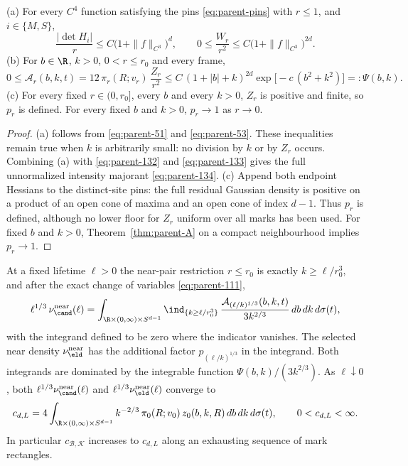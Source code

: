 \begin{lemma}\label{lem:parent-majorant}
\textup{(a)} For every $C^4$ function satisfying the pins \eqref{eq:parent-pins} with $r\le1$, and $i\in\{M,S\}$,
\begin{equation}\label{eq:parent-detbound}
\frac{|\det H_i|}r\le C\bigl(1+\|f\|_{C^3}\bigr)^d,\qquad 0\le\frac{W_r}{r^2}\le C\bigl(1+\|f\|_{C^3}\bigr)^{2d}.
\end{equation}
\textup{(b)} For $b\in\R$, $k>0$, $0<r\le r_0$ and every frame,
\begin{equation}\label{eq:parent-134}
0\le\mathcal A_r(b,k,t)=12\,\pi_r(R;v_r)\,\frac{Z_r}{r^2}\le C\,(1+|b|+k)^{2d}\exp\bigl[-c\,(b^2+k^2)\bigr]=:\Psi(b,k).
\end{equation}
\textup{(c)} For every fixed $r\in(0,r_0]$, every $b$ and every $k>0$, $Z_r$ is positive and finite, so $p_r$ is defined. For every fixed $b$ and $k>0$, $p_r\to1$ as $r\to0$.
\end{lemma}

\begin{proof}
(a) follows from \eqref{eq:parent-51} and \eqref{eq:parent-53}. These inequalities remain true when $k$ is arbitrarily small: no division by $k$ or by $Z_r$ occurs. Combining (a) with \eqref{eq:parent-132} and \eqref{eq:parent-133} gives the full unnormalized intensity majorant \eqref{eq:parent-134}. (c) Append both endpoint Hessians to the distinct-site pins: the full residual Gaussian density is positive on a product of an open cone of maxima and an open cone of index $d-1$. Thus $p_r$ is defined, although no lower floor for $Z_r$ uniform over all marks has been used. For fixed $b$ and $k>0$, Theorem~\ref{thm:parent-A} on a compact neighbourhood implies $p_r\to1$.
\end{proof}

\begin{proposition}\label{prop:parent-near}
At a fixed lifetime $\ell>0$ the near-pair restriction $r\le r_0$ is exactly $k\ge\ell/r_0^3$, and after the exact change of variables \eqref{eq:parent-111},
\begin{equation}\label{eq:parent-135}
\ell^{1/3}\,\nu^{\rm near}_\cand(\ell)=\int_{\R\times(0,\infty)\times S^{d-1}}\ind_{\{k\ge\ell/r_0^3\}}\,\frac{\mathcal A_{(\ell/k)^{1/3}}(b,k,t)}{3k^{2/3}}\,db\,dk\,d\sigma(t),
\end{equation}
with the integrand defined to be zero where the indicator vanishes. The selected near density $\nu^{\rm near}_\eld$ has the additional factor $p_{(\ell/k)^{1/3}}$ in the integrand. Both integrands are dominated by the integrable function $\Psi(b,k)/(3k^{2/3})$. As $\ell\downarrow0$, both $\ell^{1/3}\nu^{\rm near}_\cand(\ell)$ and $\ell^{1/3}\nu^{\rm near}_\eld(\ell)$ converge to
\begin{equation}\label{eq:parent-136}
c_{d,L}=4\int_{\R\times(0,\infty)\times S^{d-1}}k^{-2/3}\,\pi_0(R;v_0)\,z_0(b,k,R)\,db\,dk\,d\sigma(t),\qquad 0<c_{d,L}<\infty .
\end{equation}
In particular $c_{\mathcal B,\mathcal K}$ increases to $c_{d,L}$ along an exhausting sequence of mark rectangles.
\end{proposition}

